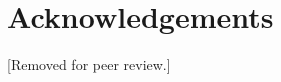 \documentclass{scaffold/sigchi}
\begin{document}


\section{Acknowledgements}
[Removed for peer review.]

\balance{}




\end{document}
